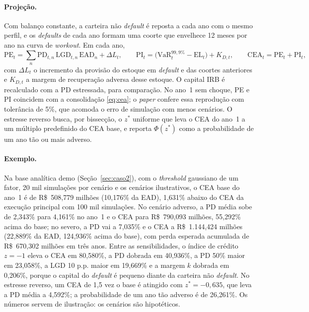 \documentclass[11pt,a4paper]{article}
\newcommand{\VaR}{\mathrm{VaR}}
\begin{document}
\paragraph{Projeção.} Com balanço constante, a carteira não \emph{default} é reposta a cada ano com o mesmo perfil, e os \emph{defaults} de cada ano formam uma coorte que envelhece 12 meses por ano na curva de \emph{workout}. Em cada ano,
\begin{equation}
\mathrm{PE}_t=\sum_n\mathrm{PD}_{t,n}\,\mathrm{LGD}_{t,n}\,\mathrm{EAD}_n+\Delta L_t,\qquad
\mathrm{PI}_t=\bigl(\VaR^{99{,}9\%}_t-\mathrm{EL}_t\bigr)+K_{D,t},\qquad
\mathrm{CEA}_t=\mathrm{PE}_t+\mathrm{PI}_t,
\end{equation}
com $\Delta L_t$ o incremento da provisão do estoque em \emph{default} e das coortes anteriores e $K_{D,t}$ a margem de recuperação adversa desse estoque. O capital IRB é recalculado com a PD estressada, para comparação. No ano~1 sem choque, PE e PI coincidem com a consolidação \eqref{eq:cea}; o \emph{paper} confere essa reprodução com tolerância de 5\%, que acomoda o erro de simulação com menos cenários. O estresse reverso busca, por bissecção, o $z^\ast$ uniforme que leva o CEA do ano~1 a um múltiplo predefinido do CEA base, e reporta $\Phi(z^\ast)$ como a probabilidade de um ano tão ou mais adverso.

\paragraph{Exemplo.} Na base analítica demo (Seção~\ref{sec:caso2}), com o \emph{threshold} gaussiano de um fator, 20 mil simulações por cenário e os cenários ilustrativos, o CEA base do ano~1 é de R\$~508{,}779 milhões (10{,}176\% da EAD), 1{,}631\% abaixo do CEA da execução principal com 100 mil simulações. No cenário adverso, a PD média sobe de 2{,}343\% para 4{,}161\% no ano~1 e o CEA para R\$~790{,}093 milhões, 55{,}292\% acima do base; no severo, a PD vai a 7{,}035\% e o CEA a R\$~1.144{,}424 milhões (22{,}889\% da EAD, 124{,}936\% acima do base), com perda esperada acumulada de R\$~670{,}302 milhões em três anos. Entre as sensibilidades, o índice de crédito $z=-1$ eleva o CEA em 80{,}580\%, a PD dobrada em 40{,}936\%, a PD 50\% maior em 23{,}058\%, a LGD 10 p.p. maior em 19{,}669\% e a margem $k$ dobrada em 0{,}206\%, porque o capital do \emph{default} é pequeno diante da carteira não \emph{default}. No estresse reverso, um CEA de 1{,}5 vez o base é atingido com $z^\ast=-0{,}635$, que leva a PD média a 4{,}592\%; a probabilidade de um ano tão adverso é de 26{,}261\%. Os números servem de ilustração: os cenários são hipotéticos.
\end{document}
